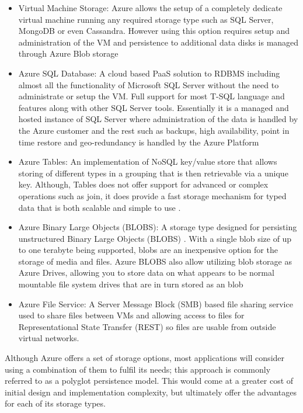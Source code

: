\begin{itemize}
\item Virtual Machine Storage: Azure allows the setup of a completely dedicate virtual machine running any required storage type such as SQL Server, MongoDB or even Cassandra. However using this option requires setup and administration of the VM and persistence to additional data disks is managed through Azure Blob storage
\item Azure SQL Database: A cloud based PaaS solution to RDBMS including almost all the functionality of Microsoft SQL Server without the need to administrate or setup the VM.  Full support for most T-SQL language and features along with other SQL Server tools. Essentially it is a managed and hosted instance of SQL Server where administration of the data is handled by the Azure customer and the rest such as backups, high availability, point in time restore and geo-redundancy is handled by the Azure Platform \cite{Microsoft_Corporation_undated-ej}
\item Azure Tables: An implementation of NoSQL key/value store that allows storing of different types in a grouping that is then retrievable via a unique key. Although, Tables does not offer support for advanced or complex operations such as join, it does provide a fast storage mechanism for typed data that is both scalable and simple to use \cite{Microsoft_Corporation_undated-ej}.
\item Azure Binary Large Objects (BLOBS): A storage type designed for persisting unstructured Binary Large Objects (BLOBS) \cite{Microsoft_Corporation_undated-ej}. With a single blob size of up to one terabyte being supported, blobs are an inexpensive option for the storage of media and files. Azure BLOBS also allow utilizing blob storage as Azure Drives, allowing you to store data on what appears to be normal mountable file system drives that are in turn stored as an blob
\item Azure File Service: A Server Message Block (SMB) based file sharing service used to share files between VMs and allowing access to files for Representational State Transfer (REST) so files are usable from outside virtual networks.
\end{itemize}


Although Azure offers a set of storage options, most applications will consider using a combination of them to fulfil its needs; this approach is commonly referred to as a polyglot persistence  model. This would come at a greater cost of initial design and implementation complexity, but ultimately offer the advantages for each of its storage types.
 
